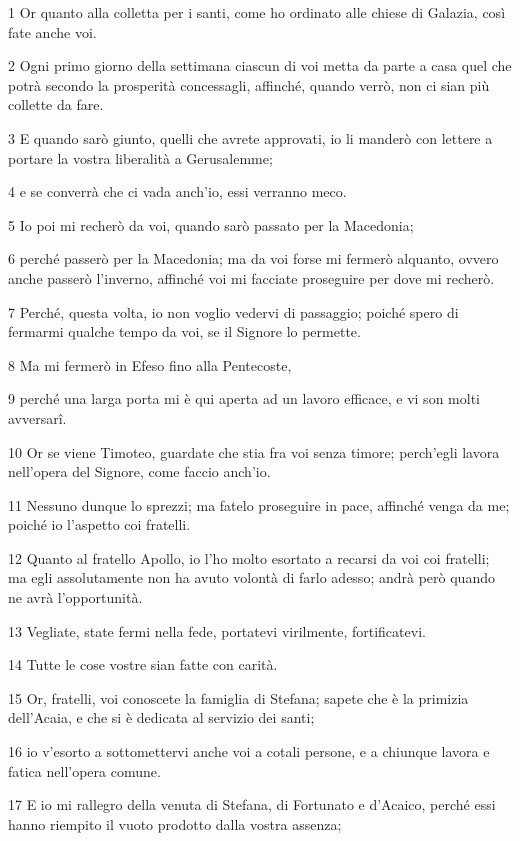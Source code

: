 \par 1 Or quanto alla colletta per i santi, come ho ordinato alle chiese di Galazia, così fate anche voi.
\par 2 Ogni primo giorno della settimana ciascun di voi metta da parte a casa quel che potrà secondo la prosperità concessagli, affinché, quando verrò, non ci sian più collette da fare.
\par 3 E quando sarò giunto, quelli che avrete approvati, io li manderò con lettere a portare la vostra liberalità a Gerusalemme;
\par 4 e se converrà che ci vada anch'io, essi verranno meco.
\par 5 Io poi mi recherò da voi, quando sarò passato per la Macedonia;
\par 6 perché passerò per la Macedonia; ma da voi forse mi fermerò alquanto, ovvero anche passerò l'inverno, affinché voi mi facciate proseguire per dove mi recherò.
\par 7 Perché, questa volta, io non voglio vedervi di passaggio; poiché spero di fermarmi qualche tempo da voi, se il Signore lo permette.
\par 8 Ma mi fermerò in Efeso fino alla Pentecoste,
\par 9 perché una larga porta mi è qui aperta ad un lavoro efficace, e vi son molti avversarî.
\par 10 Or se viene Timoteo, guardate che stia fra voi senza timore; perch'egli lavora nell'opera del Signore, come faccio anch'io.
\par 11 Nessuno dunque lo sprezzi; ma fatelo proseguire in pace, affinché venga da me; poiché io l'aspetto coi fratelli.
\par 12 Quanto al fratello Apollo, io l'ho molto esortato a recarsi da voi coi fratelli; ma egli assolutamente non ha avuto volontà di farlo adesso; andrà però quando ne avrà l'opportunità.
\par 13 Vegliate, state fermi nella fede, portatevi virilmente, fortificatevi.
\par 14 Tutte le cose vostre sian fatte con carità.
\par 15 Or, fratelli, voi conoscete la famiglia di Stefana; sapete che è la primizia dell'Acaia, e che si è dedicata al servizio dei santi;
\par 16 io v'esorto a sottomettervi anche voi a cotali persone, e a chiunque lavora e fatica nell'opera comune.
\par 17 E io mi rallegro della venuta di Stefana, di Fortunato e d'Acaico, perché essi hanno riempito il vuoto prodotto dalla vostra assenza;
